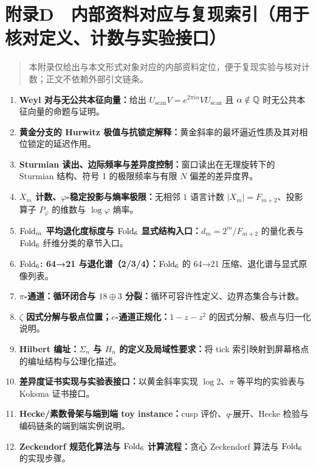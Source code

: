 \section{附录D　内部资料对应与复现索引（用于核对定义、计数与实验接口）}

\begin{quote}
本附录仅给出与本文形式对象对应的内部资料定位，便于复现实验与核对计数；正文不依赖外部引文链条。
\end{quote}

\begin{enumerate}
  \item \textbf{Weyl 对与无公共本征向量：}给出 $U_{\mathrm{scan}}V=e^{2\pi i\alpha}VU_{\mathrm{scan}}$ 且 $\alpha\notin\mathbb{Q}$ 时无公共本征向量的命题与证明。
  \item \textbf{黄金分支的 Hurwitz 极值与抗锁定解释：}黄金斜率的最坏逼近性质及其对相位锁定的延迟作用。
  \item \textbf{Sturmian 读出、边际频率与差异度控制：}窗口读出在无理旋转下的 Sturmian 结构、符号 1 的极限频率与有限 $N$ 偏差的差异度界。
  \item \textbf{$X_m$ 计数、$\varphi$-稳定投影与熵率极限：}无相邻 $1$ 语言计数 $|X_m|=F_{m+2}$、投影算子 $P_\varphi$ 的维数与 $\log\varphi$ 熵率。
  \item \textbf{$\mathrm{Fold}_m$ 平均退化度标度与 $\mathrm{Fold}_6$ 显式结构入口：}$d_m=2^m/F_{m+2}$ 的量化表与 $\mathrm{Fold}_6$ 纤维分类的章节入口。
  \item \textbf{$\mathrm{Fold}_6$: 64→21 与退化谱（2/3/4）：}$\mathrm{Fold}_6$ 的 64→21 压缩、退化谱与显式原像列表。
  \item \textbf{$\pi$-通道：循环闭合与 $18\oplus 3$ 分裂：}循环可容许性定义、边界态集合与计数。
  \item \textbf{$\zeta$ 因式分解与极点位置；$e$-通道正规化：}$1-z-z^2$ 的因式分解、极点与归一化说明。
  \item \textbf{Hilbert 编址：$\Sigma_n$ 与 $H_n$ 的定义及局域性要求：}将 tick 索引映射到屏幕格点的编址结构与公理化描述。
  \item \textbf{差异度证书实现与实验表接口：}以黄金斜率实现 $\log 2$、$\pi$ 等平均的实验表与 Koksma 证书接口。
  \item \textbf{Hecke/素数骨架与端到端 toy instance：}cusp 评价、$q$-展开、Hecke 检验与编码链条的端到端实例说明。
  \item \textbf{Zeckendorf 规范化算法与 $\mathrm{Fold}_6$ 计算流程：}贪心 Zeckendorf 算法与 $\mathrm{Fold}_6$ 的实现步骤。
\end{enumerate}


